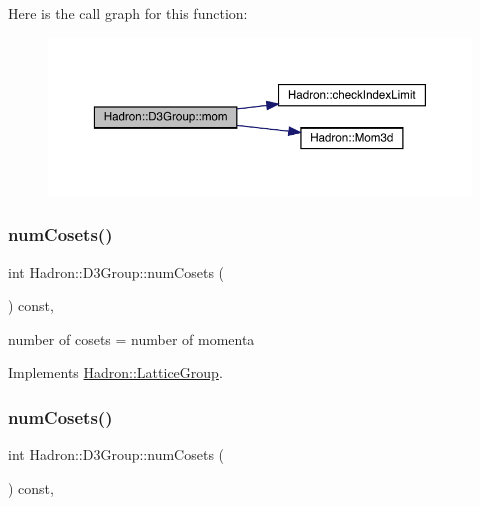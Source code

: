 Here is the call graph for this function\+:
\nopagebreak
\begin{figure}[H]
\begin{center}
\leavevmode
\includegraphics[width=350pt]{de/de1/structHadron_1_1D3Group_a5662028a7fb3554c893609148e6d3eeb_cgraph}
\end{center}
\end{figure}
\mbox{\label{structHadron_1_1D3Group_a33af6b6378351a7b023c23940c69403f}} 
\subsubsection{\texorpdfstring{numCosets()}{numCosets()}\hspace{0.1cm}{\footnotesize\ttfamily [1/3]}}
{\footnotesize\ttfamily int Hadron\+::\+D3\+Group\+::num\+Cosets (\begin{DoxyParamCaption}{ }\end{DoxyParamCaption}) const\hspace{0.3cm}{\ttfamily [inline]}, {\ttfamily [virtual]}}

number of cosets = number of momenta 

Implements \mbox{\hyperlink{structHadron_1_1LatticeGroup_afc76430f36a3a041f86d4058c59bf55e}{Hadron\+::\+Lattice\+Group}}.

\mbox{\label{structHadron_1_1D3Group_a33af6b6378351a7b023c23940c69403f}} 
\subsubsection{\texorpdfstring{numCosets()}{numCosets()}\hspace{0.1cm}{\footnotesize\ttfamily [2/3]}}
{\footnotesize\ttfamily int Hadron\+::\+D3\+Group\+::num\+Cosets (\begin{DoxyParamCaption}{ }\end{DoxyParamCaption}) const\hspace{0.3cm}{\ttfamily [inline]}, {\ttfamily [virtual]}}

